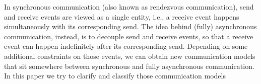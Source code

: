In synchronous communication (also known as rendezvous communication), send and receive events are  viewed as a single entity, i.e., a receive event  happens simultaneously with its corresponding send. The  idea behind (fully) asynchronous communication, instead, is to decouple send and receive events, so that a receive event can happen indefinitely after its corresponding send. Depending on some additional constraints on those events, we can obtain new communication models that sit somewhere between synchronous and fully asynchronous communication. 
In this paper we try to clarify and classify those communication models
